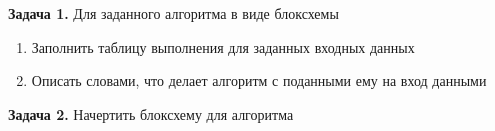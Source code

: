 \documentclass[a4paper,10pt]{article}
\begin{document}
 


\textbf{Задача 1.} Для заданного алгоритма в виде блоксхемы
\begin{enumerate}
 \item Заполнить таблицу выполнения для заданных входных данных
 \item Описать словами, что делает алгоритм с поданными ему на вход данными
\end{enumerate}



\newpage
\textbf{Задача 2.} Начертить блоксхему для алгоритма


\vspace{\fill}
\newpage
\end{document}
